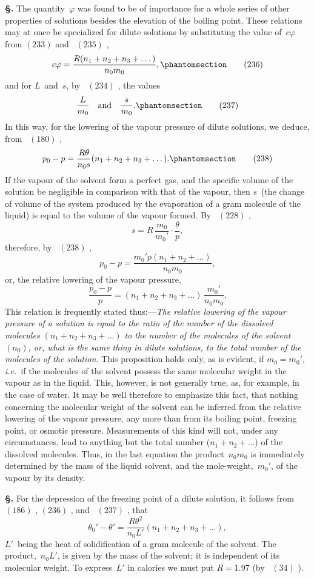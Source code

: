 \documentclass[12pt]{book}[2005/09/16]
\newcommand{\Chg}[2]{#2}
\newcommand{\Add}[1]{\Chg{}{#1}}
\newcommand{\Section}[1]{
  \medskip\par\textbf{§\;#1}
  \label{section:#1}
}
\newcommand{\Tag}[1]{%
  \phantomsection\label{eqn:#1}\tag*{\ensuremath{#1}}%
}
\newcommand{\Eq}[1]{%
  \hyperref[eqn:#1]{\ensuremath{#1}}%
}
\newcommand{\PageSep}[1]{\ignorespaces}
\newcommand{\ie}{\emph{i.e.}}
\begin{document}
\Section{270.} The quantity~$\varphi$ was found to be of importance for
a whole series of other properties of solutions besides the
elevation of the boiling point. These relations may at once
be specialized for dilute solutions by substituting the value
of~$c\varphi$ from \Eq{(233)} and~\Eq{(235)},
\[
c\varphi = \frac{R(n_{1} + n_{2} + n_{3} + \dots)}{n_{0} m_{0}},
\Tag{(236)}
\]
and for $L$~and~$s$, by~\Eq{(234)}, the values
\[
\frac{L}{m_{0}}\quad\text{and}\quad \frac{s}{m_{0}}\Add{.}
\Tag{(237)}
\]
In this way, for the lowering of the vapour pressure of dilute
solutions, we deduce, from~\Eq{(180)},
\[
p_{0} - p = \frac{R\theta}{n_{0}s} (n_{1} + n_{2} + n_{3} + \dots).
\Tag{(238)}
\]
If the vapour of the solvent form a perfect gas, and the
specific volume of the solution be negligible in comparison
with that of the vapour, then $s$~(the change of volume of
the system produced by the evaporation of a gram molecule
of the liquid) is equal to the volume of the vapour formed.
By~\Eq{(228)},
\[
s = R\, \frac{m_{0}}{m_{0}'} · \frac{\theta}{p},
\]
\PageSep{250}
therefore, by~\Eq{(238)},
\[
p_{0} - p = \frac{m_{0}'p (n_{1} + n_{2} + \dots)}{n_{0} m_{0}},
\]
or, the relative lowering of the vapour pressure,
%
\[
\frac{p_{0} - p}{p} = (n_{1} + n_{2} + n_{3} + \dots)\, \frac{m_{0}'}{n_{0} m_{0}}.
\]
This relation is frequently stated thus:---\emph{The relative lowering
of the vapour pressure of a solution is equal to the ratio
of the number of the dissolved molecules $(n_{1} + n_{2} + n_{3} + \dots)$
to the number of the molecules of the solvent~$(n_{0})$, or, what is
the same thing in dilute solutions, to the total number of the
molecules of the solution.} This proposition holds only, as is
evident, if $m_{0} = m_{0}'$, \ie\ if the molecules of the solvent possess
the same molecular weight in the vapour as in the
liquid. This, however, is not generally true, as, for example,
in the case of water. It may be well therefore to emphasize
this fact, that nothing concerning the molecular weight of
the solvent can be inferred from the relative lowering of the
vapour pressure, any more than from its boiling point, freezing
point, or osmotic pressure. Measurements of this kind
will not, under any circumstances, lead to anything but the
total number ($n_{1} + n_{2} + \dots$) of the dissolved molecules.
Thus, in the last equation the product~$n_{0} m_{0}$ is immediately
determined by the mass of the liquid solvent, and the mole-weight,~$m_{0}'$,
of the vapour by its density.

\Section{271.} For the depression of the freezing point of a
%
%
dilute solution, it follows from \Eq{(186)}, \Eq{(236)}, and~\Eq{(237)}, that
\[
\theta_{0}' - \theta' = \frac{R \theta^{2}}{n_{0} L'} (n_{1} + n_{2} + n_{3} + \dots),
\]
$L'$~being the heat of solidification of a gram molecule of the
solvent. The product,~$n_{0} L'$, is given by the mass of the
solvent; it is independent of its molecular weight. To
express~$L'$ in calories we must put $R = 1.97$ (by~\Chg{34}{\Eq{(34)}}).
\PageSep{251}
\end{document}
